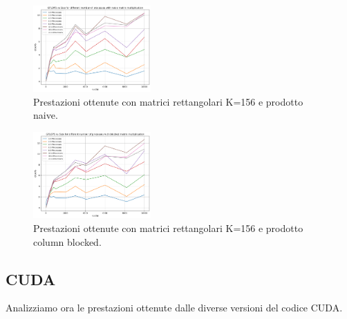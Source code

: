 \documentclass[conference]{IEEEtran}
\begin{document}
\begin{figure}[H]
    \centering
    \includegraphics[width=0.4\textwidth]{resources/rettangolari_k156_naive.png}
    \caption{Prestazioni ottenute con matrici rettangolari K=156 e prodotto naive.}
    \label{fig:rect_k156_matrix_naive}
\end{figure}
\begin{figure}[H]
    \centering
    \includegraphics[width=0.4\textwidth]{resources/rettangolari_k156_blocked.png}
    \caption{Prestazioni ottenute con matrici rettangolari K=156 e prodotto column blocked.}
    \label{fig:rect_k156_matrix_blocked}
\end{figure}
\subsection{CUDA}
Analizziamo ora le prestazioni ottenute dalle diverse versioni del codice CUDA.\\
\end{document}
